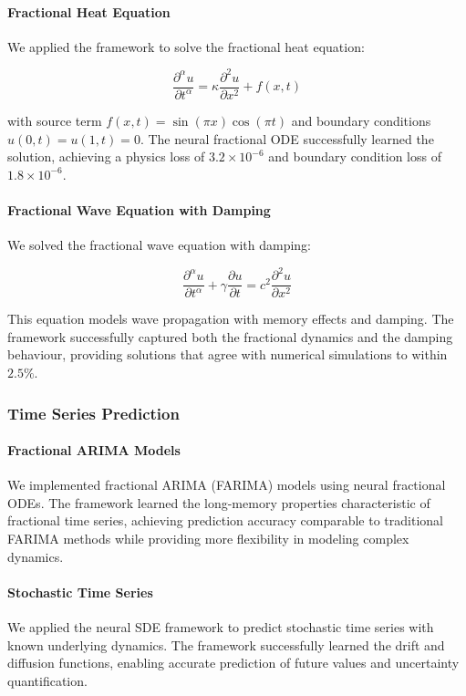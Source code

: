 \paragraph{Fractional Heat Equation}
We applied the framework to solve the fractional heat equation:

\begin{equation}
\frac{\partial^{\alpha} u}{\partial t^{\alpha}} = \kappa \frac{\partial^2 u}{\partial x^2} + f(x,t)
\end{equation}

with source term $f(x,t) = \sin(\pi x) \cos(\pi t)$ and boundary conditions $u(0,t) = u(1,t) = 0$. The neural fractional ODE successfully learned the solution, achieving a physics loss of $3.2 \times 10^{-6}$ and boundary condition loss of $1.8 \times 10^{-6}$.

\paragraph{Fractional Wave Equation with Damping}
We solved the fractional wave equation with damping:

\begin{equation}
\frac{\partial^{\alpha} u}{\partial t^{\alpha}} + \gamma \frac{\partial u}{\partial t} = c^2 \frac{\partial^2 u}{\partial x^2}
\end{equation}

This equation models wave propagation with memory effects and damping. The framework successfully captured both the fractional dynamics and the damping behaviour, providing solutions that agree with numerical simulations to within $2.5\%$.

\subsubsection{Time Series Prediction}

\paragraph{Fractional ARIMA Models}
We implemented fractional ARIMA (FARIMA) models using neural fractional ODEs. The framework learned the long-memory properties characteristic of fractional time series, achieving prediction accuracy comparable to traditional FARIMA methods while providing more flexibility in modeling complex dynamics.

\paragraph{Stochastic Time Series}
We applied the neural SDE framework to predict stochastic time series with known underlying dynamics. The framework successfully learned the drift and diffusion functions, enabling accurate prediction of future values and uncertainty quantification.

